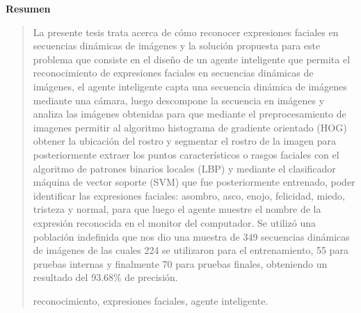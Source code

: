 \newpage
\begin{center}
 {\bf\LARGE Resumen}
\end{center} 
\vskip 0.5cm
\begin{quotation}

La presente tesis  trata acerca de cómo reconocer expresiones faciales en secuencias dinámicas de imágenes y la solución propuesta para este problema que consiste en el diseño de un agente inteligente que permita el reconocimiento de expresiones faciales en secuencias dinámicas de imágenes, el agente inteligente capta una secuencia dinámica de imágenes mediante una cámara, luego descompone la secuencia en imágenes y analiza las imágenes obtenidas para que mediante el preprocesamiento de imagenes permitir al algoritmo histograma de gradiente orientado (HOG) obtener la ubicación del rostro y segmentar el rostro de la imagen para posteriormente extraer los puntos característicos o rasgos faciales con el algoritmo de patrones binarios locales (LBP) y mediante el clasificador máquina de vector soporte (SVM) que fue posteriormente entrenado, poder identificar las expresiones faciales: asombro, asco, enojo, felicidad, miedo, tristeza y normal, para que luego el agente muestre el nombre de la expresión reconocida en el monitor del computador. Se utilizó una población indefinida que nos dio una muestra de 349 secuencias dinámicas de imágenes de las cuales 224 se utilizaron para el entrenamiento, 55 para pruebas internas y finalmente 70 para pruebas finales, obteniendo un resultado del 93.68\% de precisión.

\vskip 0.3cm
\hspace*{-0.6cm}{\bf Palabras claves:} reconocimiento, expresiones faciales, agente inteligente.
\end{quotation}



